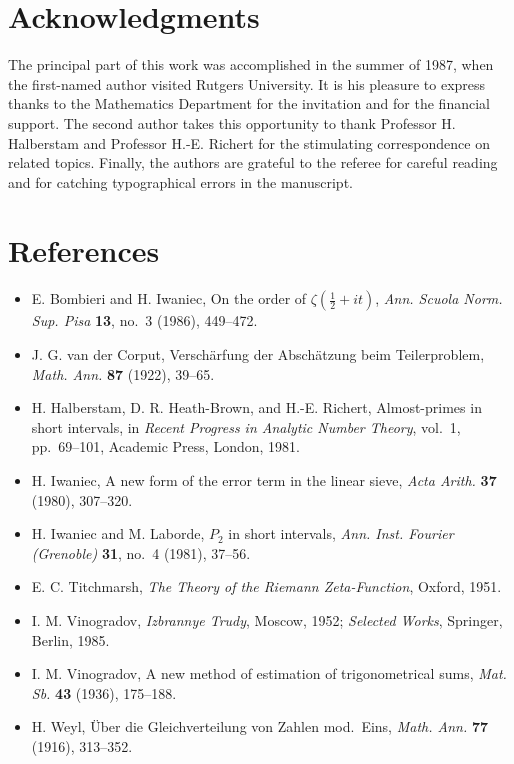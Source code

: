 \documentclass[10pt]{article}
\begin{document}
\section*{Acknowledgments}
The principal part of this work was accomplished in the summer of 1987,
when the first-named author visited Rutgers University. It is his pleasure
to express thanks to the Mathematics Department for the invitation and for
the financial support. The second author takes this opportunity to thank
Professor H. Halberstam and Professor H.-E. Richert for the stimulating
correspondence on related topics. Finally, the authors are grateful to the
referee for careful reading and for catching typographical errors in the
manuscript.

\section*{References}
\begin{itemize}
  \item[1.] E. Bombieri and H. Iwaniec, On the order of
  $\zeta\left(\frac12+it\right)$, \textit{Ann. Scuola Norm. Sup. Pisa}
  \textbf{13}, no.~3 (1986), 449--472.

  \item[2.] J. G. van der Corput, Verschärfung der Abschätzung beim
  Teilerproblem, \textit{Math. Ann.} \textbf{87} (1922), 39--65.

  \item[3.] H. Halberstam, D. R. Heath-Brown, and H.-E. Richert,
  Almost-primes in short intervals, in \textit{Recent Progress in Analytic
  Number Theory}, vol.~1, pp.~69--101, Academic Press, London, 1981.

  \item[4.] H. Iwaniec, A new form of the error term in the linear sieve,
  \textit{Acta Arith.} \textbf{37} (1980), 307--320.

  \item[5.] H. Iwaniec and M. Laborde, $P_2$ in short intervals,
  \textit{Ann. Inst. Fourier (Grenoble)} \textbf{31}, no.~4 (1981), 37--56.

  \item[6.] E. C. Titchmarsh, \textit{The Theory of the Riemann
  Zeta-Function}, Oxford, 1951.

  \item[7.] I. M. Vinogradov, \textit{Izbrannye Trudy}, Moscow, 1952;
  \textit{Selected Works}, Springer, Berlin, 1985.

  \item[8.] I. M. Vinogradov, A new method of estimation of trigonometrical
  sums, \textit{Mat. Sb.} \textbf{43} (1936), 175--188.

  \item[9.] H. Weyl, Über die Gleichverteilung von Zahlen mod.~Eins,
  \textit{Math. Ann.} \textbf{77} (1916), 313--352.
\end{itemize}
\end{document}
